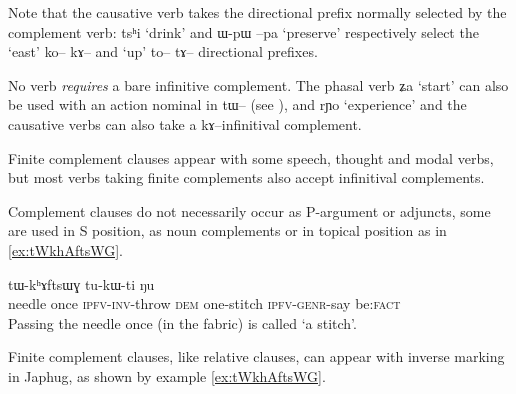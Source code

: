 \documentclass[oldfontcommands,oneside,a4paper,11pt]{article}
\newcommand{\ipa}[1]{{\phon#1}} %
\begin{document}
Note that the causative verb takes the directional prefix normally selected by the complement verb: \ipa{tsʰi} `drink' and \ipa{ɯ-pɯ} \ipa{--pa} `preserve'  respectively select the `east' \ipa{ko-- kɤ--} and `up' \ipa{to-- tɤ--} directional prefixes.

No verb \textit{requires} a bare infinitive complement. The phasal verb \ipa{ʑa} `start' can also be used with an action nominal in \ipa{tɯ--} (see \citealt[6-9]{jacques14antipassive}), and \ipa{rɲo} `experience' and the causative verbs can also take a \ipa{kɤ--}infinitival complement.

Finite complement clauses appear with some speech, thought and modal verbs, but most verbs taking finite complements also accept infinitival complements.

Complement clauses do not necessarily occur as P-argument or adjuncts, some are used in S position, as noun complements or in topical position as in \ref{ex:tWkhAftsWG}.


 \begin{exe}
\ex \label{ex:tWkhAftsWG}
\gll
[\ipa{taqaβ} 	\ipa{ci} 	\ipa{cʰɯ́-wɣ-lɤt}] 	\ipa{nɯ} 	\ipa{tɯ-kʰɤftsɯɣ} 	\ipa{tu-kɯ-ti} 	\ipa{ŋu} \\
needle once \textsc{ipfv-inv}-throw \textsc{dem} one-stitch \textsc{ipfv-genr}-say be:\textsc{fact} \\
\glt Passing the needle once (in the fabric) is called `a stitch'.
\end{exe}

Finite complement clauses, like relative clauses, can appear with inverse marking in Japhug, as shown by example \ref{ex:tWkhAftsWG}.
\end{document}
